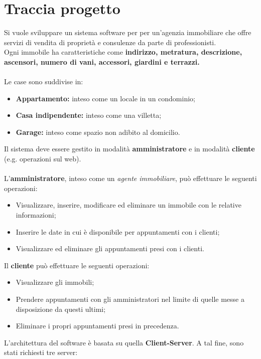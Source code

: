 \thispagestyle{headings}

\chapter{Traccia progetto} \label{trac}
\noindent Si vuole sviluppare un sistema software per per un'agenzia immobiliare che offre servizi di vendita di proprietà e consulenze da parte di professionisti.
\\
Ogni immobile ha caratteristiche come \textbf{indirizzo, metratura, descrizione, ascensori, numero di vani, accessori, giardini e terrazzi.}
\\\\
Le case sono suddivise in:
\begin{itemize}
\item \textbf{Appartamento:} inteso come un locale in un condominio;
\item \textbf{Casa indipendente:} inteso come una villetta;
\item \textbf{Garage:} inteso come spazio non adibito al domicilio.
\end{itemize}
Il sistema deve essere gestito in modalità \textbf{amministratore} e in modalità \textbf{cliente} (e.g. operazioni sul web).
\\\\
L'\textbf{amministratore}, inteso come un \textit{agente immobiliare}, può effettuare le seguenti operazioni:
\begin{itemize}
    \item Visualizzare, inserire, modificare ed eliminare un immobile con le relative informazioni;
    \item Inserire le date in cui è disponibile per appuntamenti con i clienti;
    \item Visualizzare ed eliminare gli appuntamenti presi con i clienti.
\end{itemize}
Il \textbf{cliente} può effettuare le seguenti operazioni:
\begin{itemize}
    \item Visualizzare gli immobili;
    \item Prendere appuntamenti con gli amministratori nel limite di quelle messe a disposizione da questi ultimi;
    \item Eliminare i propri appuntamenti presi in precedenza.
\end{itemize}
L'architettura del software è basata su quella \textbf{Client-Server}.
A tal fine, sono stati richiesti tre server:
